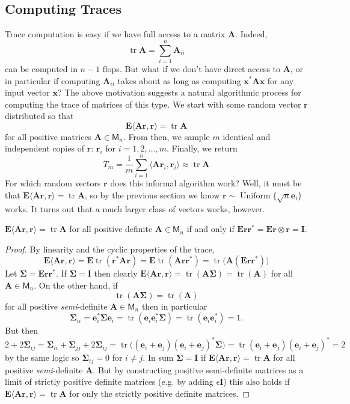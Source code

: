 \documentclass[10pt,letterpaper]{siamart171218}
\theoremstyle{definition}
\theoremstyle{remark}
\newcommand\inner[1]{\langle #1 \rangle}
\newcommand\M{\mathsf{M}}
\newcommand\E{\mathbf{E}}
\newcommand\tr{\operatorname{tr}}
\newcommand\A{\boldsymbol{A}}
\renewcommand\S{\boldsymbol{\Sigma}}
\newcommand\I{\boldsymbol{I}}
\newcommand\x{\boldsymbol{x}}
\renewcommand\r{\boldsymbol{r}}
\newcommand\e{\boldsymbol{e}}
\begin{document}
\subsection{Computing Traces}

Trace computation is easy if we have full access to a matrix $\A$.
Indeed,
\[
    \tr\A = \sum_{i=1}^n \A_{ii}
\]
can be computed in $n-1$ flops.
But what if we don't have direct access to $\A$, or in particular
if computing $\A_{ii}$ takes about as long as computing $\x^*\A\x$
for any input vector $\x$? The above motivation suggests a natural
algorithmic process for computing the trace of matrices of this
type. We start with some random vector $\r$ distributed so
that
\[
    \E \inner{\A\r,\r} = \tr\A
\]
for all positive matrices $\A\in\M_n$. From then, we sample
$m$ identical and independent copies of $\r$:
$\r_i$ for $i=1,2,\ldots,m$. Finally, we return
\[
    T_m = \frac{1}{m}\sum_{i=1}^n \inner{\A\r_i,\r_i} \approx \tr\A
\]
For which random vectors $\r$ does this informal algorithm
work? Well, it must be that $\E\inner{\A\r,\r} = \tr\A$,
so by the previous section we know $\r \sim
\operatorname{Uniform}\{\sqrt{n}\e_i\}$ works. It turns out
that a much larger class of vectors works, however.

\begin{theorem}\label{thm:whichvectors}
    $\E\inner{\A\r,\r} = \tr\A$ for all positive definite
    $\A\in\M_n$ if and only if $\E\r\r^* = \E\r\otimes\r = \I$.
\end{theorem}
\begin{proof}
    By linearity and the cyclic properties of the trace,
    \[
        \E\inner{\A\r,\r} = \E\tr(\r^*\A\r) = \E\tr(\A\r\r^*) = \tr\bigl(\A(\E\r\r^*)\bigr) 
    \]
    Let $\S = \E\r\r^*$. If $\S = \I$ then clearly
    $\E\inner{\A\r,\r} = \tr(\A\S) = \tr(\A)$ for all $\A\in\M_n$.
    On the other hand, if
    \[
        \tr(\A\S) = \tr(\A)
    \]
    for all positive \emph{semi}-definite $\A\in\M_n$ then in
    particular
    \[
        \S_{ii} = \e_i^*\S\e_i = \tr(\e_i\e_i^*\S) = \tr(\e_i\e_i^*) = 1.
    \]
    But then
    \[
        2 + 2\S_{ij} = \S_{ii} + \S_{jj} + 2\S_{ij} = \tr\bigl((\e_i+\e_j)(\e_i+\e_j)^*\S\bigr) = \tr(\e_i + \e_j)(\e_i + \e_j)^* = 2
    \]
    by the same logic so $\S_{ij} = 0$ for $i\neq j$. In sum
    $\S = \I$ if $\E\inner{\A\r,\r} = \tr\A$ for all positive
    \emph{semi}-definite $\A$. But by constructing
    positive semi-definite matrices as a limit of strictly
    positive definite matrices (e.g. by adding $\epsilon\I$)
    this also holds if $\E\inner{\A\r,\r} = \tr\A$ for
    only the strictly positive definite matrices.
\end{proof}
\end{document}
